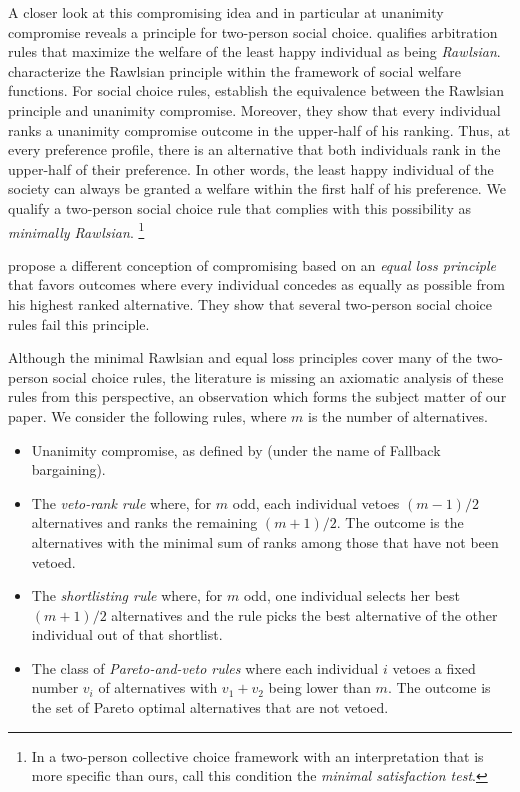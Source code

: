 \documentclass[version=3.21, pagesize, twoside=off, bibliography=totoc, DIV=calc, fontsize=12pt, a4paper]{scrartcl}
\begin{document}
A closer look at this compromising idea and in particular at unanimity compromise reveals a principle for two-person social choice.  qualifies arbitration rules that maximize the welfare of the least happy individual as being \textit{Rawlsian}. \citet{congar2012characterization} characterize the Rawlsian principle within the framework of social welfare functions. For social choice rules, \citet{BramsKilgour2001} establish the equivalence between the Rawlsian principle and unanimity compromise. Moreover, they show that every individual ranks a unanimity compromise outcome in the upper-half of his ranking. Thus, at every preference profile, there is an alternative that both individuals rank in the upper-half of their preference. In other words, the least happy individual of the society can always be granted a welfare within the first half of his preference. We qualify a two-person social choice rule that complies with this possibility as \textit{minimally Rawlsian}.%
\footnote{In a two-person collective choice framework with an interpretation that is more specific than ours, \citet{Clippel} call this condition the \textit{minimal satisfaction test}.}

 propose a different conception of compromising based on an \textit{equal loss principle} that favors outcomes where every individual concedes as equally as possible from his highest ranked alternative. They show that several two-person social choice rules fail this principle.

Although the minimal Rawlsian and equal loss principles cover many of the two-person social choice rules, the literature is missing an axiomatic analysis of these rules from this perspective, an observation which forms the subject matter of our paper. We consider the following rules, where $m$ is the number of alternatives.
\begin{itemize}
	\item Unanimity compromise, as defined by \citet{BramsKilgour2001} (under the name of Fallback bargaining).
	\item The \textit{veto-rank rule} where, for $m$ odd, each individual vetoes $(m - 1) / 2$ alternatives and ranks the remaining $(m+1) / 2$. The outcome is the alternatives with the minimal sum of ranks among those that have not been vetoed.
	\item The \textit{shortlisting rule} where, for $m$ odd, one individual selects her best $(m+1) / 2$ alternatives and the rule picks the best alternative of the other individual out of that shortlist.
	\item The class of \textit{Pareto-and-veto rules} where each individual $i$ vetoes a fixed number $v_i$ of alternatives with $v_1 + v_2$ being lower than $m$. The outcome is the set of Pareto optimal alternatives that are not vetoed. 
\end{itemize}
\end{document}
